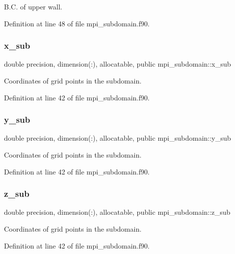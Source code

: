 B.\+C. of upper wall. 



Definition at line 48 of file mpi\+\_\+subdomain.\+f90.

\mbox{\label{namespacempi__subdomain_a978554e1520c79471ef3793ed1872b37}} 
\subsubsection{\texorpdfstring{x\_sub}{x\_sub}}
{\footnotesize\ttfamily double precision, dimension(\+:), allocatable, public mpi\+\_\+subdomain\+::x\+\_\+sub}



Coordinates of grid points in the subdomain. 



Definition at line 42 of file mpi\+\_\+subdomain.\+f90.

\mbox{\label{namespacempi__subdomain_a58b09abee5f1002de7b20b1b86f5c821}} 
\subsubsection{\texorpdfstring{y\_sub}{y\_sub}}
{\footnotesize\ttfamily double precision, dimension(\+:), allocatable, public mpi\+\_\+subdomain\+::y\+\_\+sub}



Coordinates of grid points in the subdomain. 



Definition at line 42 of file mpi\+\_\+subdomain.\+f90.

\mbox{\label{namespacempi__subdomain_aab6d78e49471a9a3db5ad9df4c3d4041}} 
\subsubsection{\texorpdfstring{z\_sub}{z\_sub}}
{\footnotesize\ttfamily double precision, dimension(\+:), allocatable, public mpi\+\_\+subdomain\+::z\+\_\+sub}



Coordinates of grid points in the subdomain. 



Definition at line 42 of file mpi\+\_\+subdomain.\+f90.

